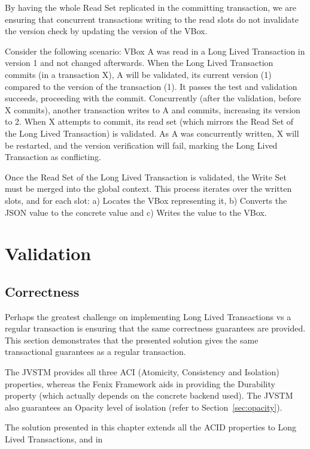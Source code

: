 By having the whole Read Set replicated in the committing transaction,
we are ensuring that concurrent transactions writing to the read slots
do not invalidate the version check by updating the version of the
VBox. 

Consider the following scenario: VBox A was read in a Long Lived
Transaction in version 1 and not changed afterwards. When the Long
Lived Transaction commits (in a transaction X), A will be validated,
its current version (1) compared to the version of the transaction
(1). It passes the test and validation succeeds, proceeding with the
commit. Concurrently (after the validation, before X commits), another
transaction writes to A and commits, increasing its version to 2. When
X attempts to commit, its read set (which mirrors the Read Set of the
Long Lived Transaction) is validated. As A was concurrently written, X
will be restarted, and the version verification will fail, marking the
Long Lived Transaction as conflicting.

Once the Read Set of the Long Lived Transaction is validated, the
Write Set must be merged into the global context. This process
iterates over the written slots, and for each slot: a) Locates the
VBox representing it, b) Converts the JSON value to the concrete value
and c) Writes the value to the VBox.


\section{Validation}
\label{sec:validation}


\subsection{Correctness}

Perhaps the greatest challenge on implementing Long Lived Transactions
vs a regular transaction is ensuring that the same correctness
guarantees are provided. This section demonstrates that the presented
solution gives the same transactional guarantees as a regular transaction.

The JVSTM provides all three ACI (Atomicity, Consistency and
Isolation) properties, whereas the Fenix Framework aids in providing
the Durability property (which actually depends on the concrete
backend used). The JVSTM also guarantees an Opacity level of
isolation (refer to Section~\ref{sec:opacity}).

The solution presented in this chapter extends all the ACID properties
to Long Lived Transactions, and in 



